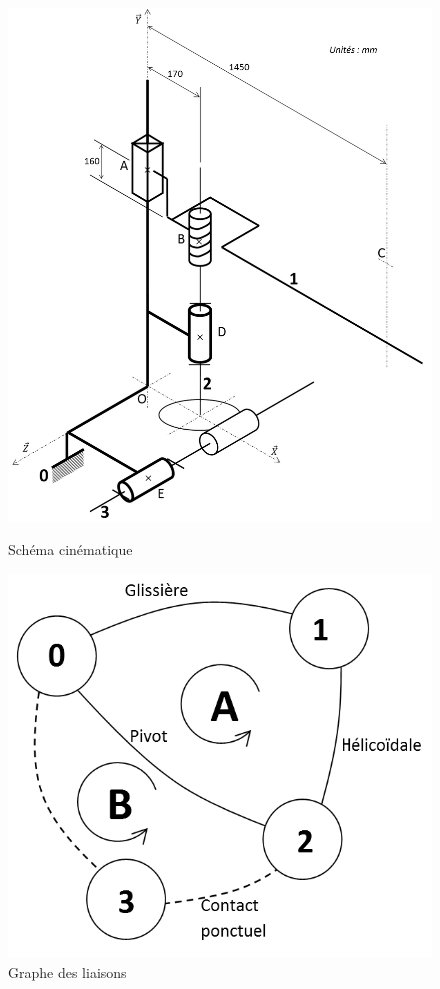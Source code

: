 \begin{figure}[!h]
\centering
\begin{minipage}{0.5\linewidth}
\includegraphics[width=0.8\linewidth]{img/fig8}
\caption{Schéma cinématique}
\label{fig8}
\end{minipage}\hfill
\begin{minipage}{0.45\linewidth}
\includegraphics[width=\linewidth]{img/fig9}
\caption{Graphe des liaisons}
\label{fig9}
\end{minipage}
\end{figure}


